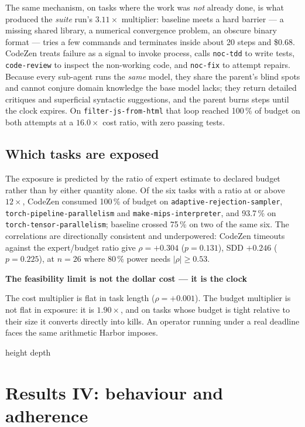 \documentclass[11pt,a4paper]{article}
\newenvironment{finding}[1]
  {\par\medskip\noindent\begin{lrbox}{\findingbox}%
   \begin{minipage}{\dimexpr\linewidth-2\fboxsep-4pt}%
   \vspace{3pt}\textbf{\color{accent}#1}\par\smallskip\small}
  {\vspace{4pt}\end{minipage}\end{lrbox}%
   \noindent\textcolor{accent}{\vrule width 2pt height \dimexpr\ht\findingbox\relax depth \dimexpr\dp\findingbox\relax}%
   \colorbox{shade}{\usebox{\findingbox}}\par\medskip}
\newcommand{\code}[1]{\texttt{\small #1}}
\newcommand{\task}[1]{\texttt{\footnotesize #1}}
\begin{document}
\noindent The same mechanism, on tasks where the work was \emph{not} already done, is what
produced the \emph{suite} run's $3.11\times$ multiplier: baseline meets a hard barrier ---
a missing shared library, a numerical convergence problem, an obscure binary format --- tries
a few commands and terminates inside about 20 steps and \$0.68. CodeZen treats failure as a
signal to invoke process, calls \code{noc-tdd} to write tests, \code{code-review} to inspect
the non-working code, and \code{noc-fix} to attempt repairs. Because every sub-agent runs the
\emph{same} model, they share the parent's blind spots and cannot conjure domain knowledge
the base model lacks; they return detailed critiques and superficial syntactic suggestions,
and the parent burns steps until the clock expires. On \task{filter-js-from-html} that loop
reached 100\,\% of budget on both attempts at a $16.0\times$ cost ratio, with zero passing
tests.

\subsection{Which tasks are exposed}

The exposure is predicted by the ratio of expert estimate to declared budget rather than by
either quantity alone. Of the six tasks with a ratio at or above $12\times$, CodeZen consumed
100\,\% of budget on \task{adaptive-rejection-sampler}, \task{torch-pipeline-parallelism} and
\task{make-mips-interpreter}, and 93.7\,\% on \task{torch-tensor-parallelism}; baseline
crossed 75\,\% on two of the same six. The correlations are directionally consistent and
underpowered: CodeZen timeouts against the expert/budget ratio give $\rho = +0.304$
($p = 0.131$), SDD $+0.246$ ($p = 0.225$), at $n = 26$ where 80\,\% power needs
$|\rho| \ge 0.53$.

\begin{finding}{The feasibility limit is not the dollar cost --- it is the clock}
The cost multiplier is flat in task length ($\rho = +0.001$). The budget multiplier is not
flat in exposure: it is $1.90\times$, and on tasks whose budget is tight relative to their
size it converts directly into kills. An operator running under a real deadline faces the
same arithmetic Harbor imposes.
\end{finding}

\clearpage
\section{Results IV: behaviour and adherence}
\label{sec:behaviour}
\end{document}
